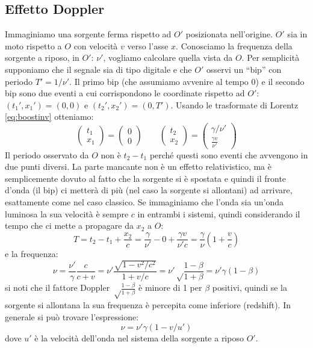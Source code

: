 \subsection{Effetto Doppler}
Immaginiamo una sorgente ferma rispetto ad $O'$ posizionata nell'origine. $O'$ sia in moto rispetto a $O$ con velocità $v$ verso l'asse $x$. Conosciamo la frequenza della sorgente a riposo, in $O'$: $\nu'$, vogliamo calcolare quella vista da $O$. Per semplicità supponiamo che il segnale sia di tipo digitale e che $O'$ osservi un ``bip'' con periodo $T'=1/\nu'$. Il primo bip (che assumiamo avvenire al tempo $0$) e il secondo bip sono due eventi a cui corrispondono le coordinate rispetto ad $O'$: $(t_1', x_1') = (0, 0)$ e $(t_2', x_2') = (0, T')$. Usando le trasformate di Lorentz \eqref{eq:boostinv} otteniamo:
\[
   \begin{pmatrix}t_1\\ x_1\end{pmatrix} = \begin{pmatrix}0\\0\end{pmatrix}\qquad \begin{pmatrix}t_2\\ x_2\end{pmatrix} = \begin{pmatrix}\gamma/\nu'\\ \frac{\gamma v}{\nu'}\end{pmatrix}
\]
Il periodo osservato da $O$ non è $t_2-t_1$ perché questi sono eventi che avvengono in due punti diversi. La parte mancante non è un effetto relativistico, ma è semplicemente dovuto al fatto che la sorgente si è spostata e quindi il fronte d'onda (il bip) ci metterà di più (nel caso la sorgente si allontani) ad arrivare, esattamente come nel caso classico. Se immaginiamo che l'onda sia un'onda luminosa la sua velocità è sempre $c$ in entrambi i sistemi, quindi considerando il tempo che ci mette a propagare da $x_2$ a $O$:
\[
   T = t_2 - t_1 + \frac{x_2}{c} = \frac{\gamma}{\nu'} - 0 + \frac{\gamma v}{\nu' c} = \frac{\gamma}{\nu}\left(1 + \frac{v}{c}\right)
\]
e la frequenza:
\[
   \nu = \frac{\nu'}{\gamma}\frac{c}{c + v} = \nu'\frac{\sqrt{1 - v^2/c^2}}{1+v/c}=\nu'\sqrt\frac{1-\beta}{1+\beta} = \nu'\gamma(1-\beta)
\]
si noti che il fattore Doppler $\sqrt\frac{1-\beta}{1+\beta}$ è minore di 1 per $\beta$ positivi, quindi se la sorgente si allontana la sua frequenza è percepita come inferiore (redshift). In generale si può trovare l'espressione:
\begin{equation}
   \nu = \nu'\gamma\left(1 - v/u'\right)
\end{equation}
dove $u'$ è la velocità dell'onda nel sistema della sorgente a riposo $O'$.


